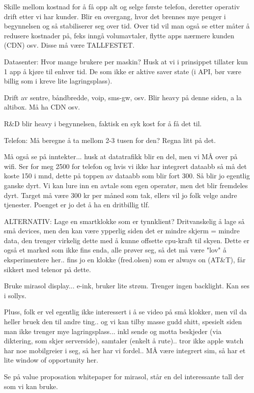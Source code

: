 Skille mellom kostnad for å få opp alt og selge første telefon, deretter
operativ drift etter vi har kunder. Blir en overgang, hvor det brennes mye
penger i begynnelsen og så stabiliserer seg over tid. Over tid vil man også se
etter måter å redusere kostnader på, feks inngå volumavtaler, flytte apps
nærmere kunden (CDN) osv. Disse må være TALLFESTET.

Datasenter: Hvor mange brukere per maskin? Husk at vi i prinsippet tillater kun
1 app å kjøre til enhver tid. De som ikke er aktive saver state (i API, bør
være billig som i kreve lite lagringsplass).

Drift av sentre, båndbredde, voip, sms-gw, osv. Blir heavy på denne siden, a la
altibox. Må ha CDN osv.

R\&{}D blir heavy i begynnelsen, faktisk en syk kost for å få det til.

Telefon: Må beregne å ta mellom 2-3 tusen for den? Regna litt på det.

Må også se på inntekter... husk at datatrafikk blir en del, men vi MÅ over på
wifi. Ser for meg 2500 for telefon og hvis vi ikke har integrert dataabb så må
det koste 150 i mnd, dette på toppen av dataabb som blir fort 300. Så blir jo
egentlig ganske dyrt. Vi kan lure inn en avtale som egen operatør, men det blir
fremdeles dyrt. Target må være 300 kr per måned som tak, ellers vil jo folk
velge andre tjenester. Poenget er jo det å ha en dritbillig tlf.

ALTERNATIV: Lage en smartklokke som er tynnklient? Dritvanskelig å lage så små
devices, men den kan være ypperlig siden det er mindre skjerm = mindre data,
den trenger virkelig dette med å kunne offsette cpu-kraft til skyen. Dette er
også et marked som ikke fins enda, alle prøver seg, så det må være "lov" å
eksperimentere her.. fins jo en klokke (fred.olsen) som er always on (AT\&{}T),
får sikkert med telenor på dette.

Bruke mirasol display... e-ink, bruker lite strøm. Trenger ingen backlight. Kan
ses i sollys.

Pluss, folk er vel egentlig ikke interessert i å se video på små klokker, men
vil da heller bruek den til andre ting.. og vi kan tilby masse gudd shitt,
spesielt siden man ikke trenger mye lagringsplass... inkl sende og motta
beskjeder (via diktering, som skjer serverside), samtaler (enkelt å rute)..
tror ikke apple watch har noe mobilgreier i seg, så her har vi fordel.. MÅ være
integrert sim, så har et lite window of opportunity her.

Se på value proposation whitepaper for mirasol, står en del interessante tall
der som vi kan bruke.

